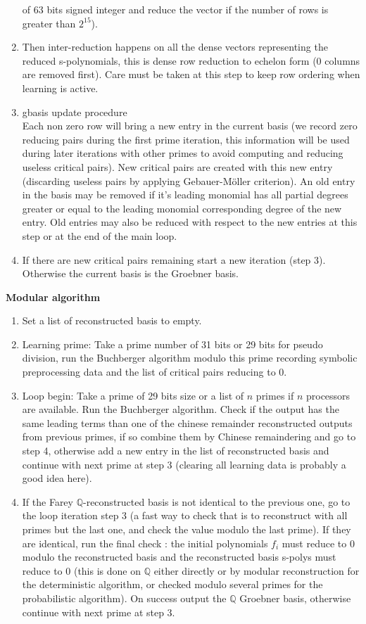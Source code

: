 \documentclass[a4paper,11pt]{article}
\newcommand{\Q}{{\mathbb{Q}}}
\begin{document}
\begin{enumerate}
of 63 bits signed integer and reduce the vector if the number
of rows is greater than $2^{15}$).
\item Then inter-reduction happens on all the dense vectors representing
the reduced s-polynomials, this is dense row
reduction to echelon form (0 columns are removed first). 
Care must be taken at this step
to keep row ordering when learning is active.
\item gbasis update procedure\\
Each non zero row will bring a new entry in the current
basis (we record zero reducing pairs during the first prime iteration,
this information will be used during later iterations with other
primes to avoid computing and reducing
useless critical pairs). 
New critical pairs are created with this new entry (discarding useless
pairs by applying Gebauer-M\"oller criterion).
An old entry in the basis may be removed if it's leading monomial
has all partial degrees greater or equal to the leading monomial
corresponding degree of the new entry.
Old entries may also be reduced with respect to the new entries 
at this step or at the end of the main loop.
\item If there are new critical pairs remaining start a new iteration
  (step 3). Otherwise the current basis is the Groebner basis.
\end{enumerate}

{\bf Modular algorithm}
\begin{enumerate}
\item Set a list of reconstructed basis to empty.
\item Learning prime: Take a prime number of 31 bits 
or 29 bits for pseudo division, run the Buchberger algorithm modulo this
prime recording symbolic preprocessing data and the list of critical pairs
reducing to 0.
\item Loop begin:
Take a prime of 29 bits size or a list of $n$ primes if $n$ processors
are available. Run the Buchberger algorithm.
Check if the output has the same leading terms than one of the
chinese remainder reconstructed outputs from previous primes,
if so combine them by Chinese remaindering and go to step 4, otherwise add
a new entry in the list of reconstructed basis and continue with
next prime at step 3 (clearing all learning data is probably a good
idea here).
\item If the Farey $\Q$-reconstructed basis is not 
identical to the previous one, go to the loop iteration step 3
(a fast way to check that is to reconstruct with all primes
but the last one, and check the value modulo the last prime).
If they are identical, run the final check : the initial polynomials $f_i$ must reduce
to 0 modulo the reconstructed basis and
the reconstructed basis s-polys must reduce to 0 (this is
done on $\Q$ either directly or by modular reconstruction
for the deterministic algorithm, or checked modulo several primes
for the probabilistic algorithm). On success output the $\Q$
Groebner basis, otherwise continue with next prime at step 3.
\end{enumerate}
\end{document}
